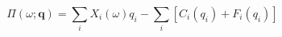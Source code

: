 \par\needspace{70pt}\begin{minipage}{\linewidth}
\begin{equation}\Pi(\omega;\mathbf q)=\sum_i X_i(\omega)q_i-\sum_i[C_i(q_i)+F_i(q_i)]\label{eq:10}\end{equation}
\end{minipage}\par
